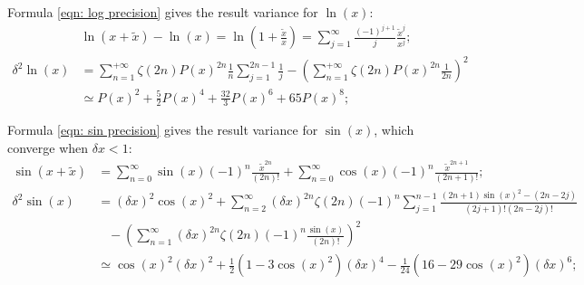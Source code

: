 \documentclass[twoside]{article}
\numberwithin{equation}{section}
\newcommand{\eqspace}{\;\;\;}
\begin{document}
Formula \eqref{eqn: log precision} gives the result variance for $\ln(x)$:
\begin{align}
\label{eqn: log Taylor}
& \ln(x + \tilde{x}) - \ln(x) = \ln(1 + \frac{\tilde{x}}{x}) = \sum_{j=1}^{\infty} \frac{(-1)^{j+1}}{j} \frac{\tilde{x}^j}{x^j}; \\
\label{eqn: log precision}
\delta^2 \ln(x) &= \sum_{n=1}^{+\infty} \zeta(2n) P(x)^{2n} \frac{1}{n} \sum_{j=1}^{2n-1} \frac{1}{j}
   - \left( \sum_{n=1}^{+\infty} \zeta(2n) P(x)^{2n} \frac{1}{2n} \right)^2 \\
 &\simeq P(x)^2 + \frac{5}{2} P(x)^4 + \frac{32}{3} P(x)^6 + 65 P(x)^8; 
\end{align}

Formula \eqref{eqn: sin precision} gives the result variance for $\sin(x)$, which converge when $\delta x < 1$:
\begin{align}
\label{eqn: sin Taylor}
\sin(x + \tilde{x}) &= \sum_{n=0}^{\infty} \sin(x) (-1)^{n} \frac{\tilde{x}^{2n}}{(2n)!} + \sum_{n=0}^{\infty} \cos(x) (-1)^n \frac{\tilde{x}^{2n+1}}{(2n + 1)!}; \\
\label{eqn: sin precision}
\delta^2 \sin(x) &= (\delta x)^2 \cos(x)^2 + \sum_{n=2}^{\infty} (\delta x)^{2n} \zeta(2n) (-1)^{n} \sum_{j=1}^{n-1} \frac{(2n+1)\sin(x)^2 - (2n-2j)}{(2j+1)!(2n-2j)!} \nonumber \\
 &\eqspace - \left(\sum_{n=1}^{\infty}(\delta x)^{2n} \zeta(2n) (-1)^{n} \frac{\sin(x)}{(2n)!}\right)^2   \\
 &\simeq \cos(x)^2 (\delta x)^2 + \frac{1} {2}(1 - 3 \cos(x)^2) (\delta x)^4 - \frac{1}{24} (16 - 29 \cos(x)^2) (\delta x)^6;
\end{align}
\end{document}
